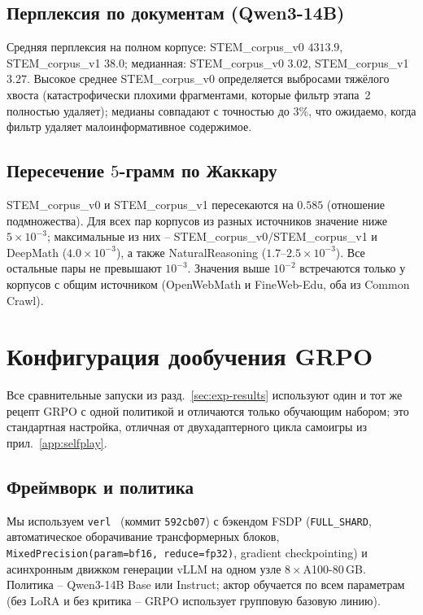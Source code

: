 \documentclass{article}
\begin{document}
\subsection{Перплексия по документам (Qwen3-14B)}
Средняя перплексия на полном корпусе: STEM\_corpus\_v0 $4313.9$, STEM\_corpus\_v1 $38.0$; медианная: STEM\_corpus\_v0 $3.02$, STEM\_corpus\_v1 $3.27$. Высокое среднее STEM\_corpus\_v0 определяется выбросами тяжёлого хвоста (катастрофически плохими фрагментами, которые фильтр этапа~2 полностью удаляет); медианы совпадают с точностью до $3\%$, что ожидаемо, когда фильтр удаляет малоинформативное содержимое.

\subsection{Пересечение $5$-грамм по Жаккару}
STEM\_corpus\_v0 и STEM\_corpus\_v1 пересекаются на $0.585$ (отношение подмножества). Для всех пар корпусов из разных источников значение ниже $5\!\times\!10^{-3}$; максимальные из них -- STEM\_corpus\_v0/STEM\_corpus\_v1 и DeepMath ($4.0\!\times\!10^{-3}$), а также NaturalReasoning ($1.7$--$2.5\!\times\!10^{-3}$). Все остальные пары не превышают $10^{-3}$. Значения выше $10^{-2}$ встречаются только у корпусов с общим источником (OpenWebMath и FineWeb-Edu, оба из Common Crawl).

\section{Конфигурация дообучения GRPO}\label{app:downstream-grpo}

Все сравнительные запуски из разд.~\ref{sec:exp-results} используют один и тот же рецепт GRPO с одной политикой и отличаются только обучающим набором; это стандартная настройка, отличная от двухадаптерного цикла самоигры из прил.~\ref{app:selfplay}.

\subsection{Фреймворк и политика}
Мы используем \texttt{verl}~\cite{sheng2024verl} (коммит \texttt{592cb07}) с бэкендом FSDP (\texttt{FULL\_SHARD}, автоматическое оборачивание трансформерных блоков, \texttt{MixedPrecision(param=bf16, reduce=fp32)}, gradient checkpointing) и асинхронным движком генерации vLLM на одном узле $8\!\times\!$A100-$80$\,GB. Политика -- Qwen3-14B Base или Instruct; актор обучается по всем параметрам (без LoRA и без критика -- GRPO использует групповую базовую линию).
\end{document}
